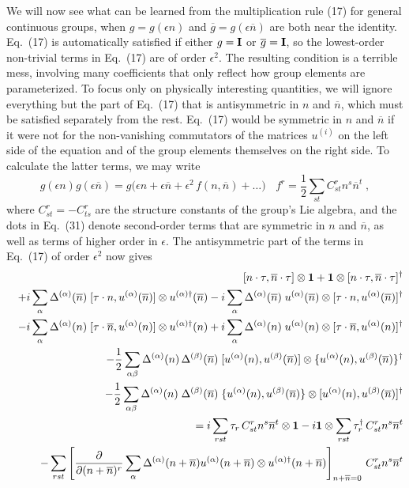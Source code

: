 We will now see what can be learned from the  multiplication rule (17) for general continuous groups, when $g=g(\epsilon n)$ and $\overline{g}=g(\epsilon\overline{n})$ are both near the identity.  Eq.~(17) is automatically satisfied if either $g={\bf I}$ or $\overline{g}={\bf I}$, so the lowest-order non-trivial terms in Eq.~(17) are of order $\epsilon^2$.  The resulting condition is a terrible mess, involving many coefficients that only reflect how group elements are parameterized.   To focus only on physically interesting quantities, we will ignore everything but the part of Eq.~(17) that is antisymmetric in $n$ and $\overline{n}$, which must be satisfied separately from the rest.   Eq.~(17) would be symmetric in $n$ and $\overline{n}$ if it were not for the non-vanishing commutators of the matrices $u^{(i)}$ on the left side of the equation and of the group elements themselves on the right side.  To calculate the latter terms, we may write                  
\begin{equation}
g(\epsilon n)g(\epsilon \overline{n})=g\Big(\epsilon n+\epsilon\overline{n}+\epsilon^2\,f(n,\overline{n})+\dots\Big)~~~~f^r=\frac{1}{2}\sum_{st}C^r_{st}n^s\overline{n}^t\;,
\end{equation}
where $C^r_{st}=-C^r_{ts}$ are the structure constants of the group's Lie algebra, and the dots in Eq.~(31) denote second-order terms that are symmetric in $n$ and $\overline{n}$, as well as terms of higher order in $\epsilon$.  The antisymmetric part of the terms in Eq.~(17) of order $\epsilon^2$ now gives
\begin{eqnarray}
&& [n\cdot\tau,\overline{n}\cdot\tau]\otimes {\mbox{\boldmath{$1$}}}+{\mbox{\boldmath{$1$}}}\otimes[n\cdot\tau,\overline{n}\cdot\tau]^\dagger\nonumber\\&&+i\sum_\alpha \Delta^{(\alpha)}(\overline{n})\;[\tau\cdot n,u^{(\alpha)}(\overline{n})]\otimes u^{(\alpha)\dagger}(\overline{n})-i\sum_\alpha \Delta^{(\alpha)}(\overline{n})\;
u^{(\alpha)}(\overline{n})\otimes [\tau\cdot n,u^{(\alpha)}(\overline{n})]^\dagger\nonumber\\&&
-i\sum_\alpha \Delta^{(\alpha)}(n)\;[\tau\cdot \overline{n},u^{(\alpha)}(n)]\otimes u^{(\alpha)\dagger}(n)+i\sum_\alpha \Delta^{(\alpha)}(n)\;
u^{(\alpha)}(n)\otimes [\tau\cdot \overline{n},u^{(\alpha)}(n)]^\dagger\nonumber\\&&
-\frac{1}{2}\sum_{\alpha\beta}\Delta^{(\alpha)}(n)\,\Delta^{(\beta)}(\overline{n})\;[u^{(\alpha)}(n),u^{(\beta)}(\overline{n})]\otimes \{u^{(\alpha)}(n),u^{(\beta)}(\overline{n})\}^\dagger\nonumber\\&&~~~
-\frac{1}{2}\sum_{\alpha\beta}\Delta^{(\alpha)}(n)\;\Delta^{(\beta)}(\overline{n})\;\{u^{(\alpha)}(n),u^{(\beta)}(\overline{n})\}\otimes [u^{(\alpha)}(n),u^{(\beta)}(\overline{n})]^\dagger\nonumber\\&&
=i\sum_{rst}\tau_r\,C^r_{st}n^s\overline{n}^t\otimes {\mbox{\boldmath{$1$}}}-i{\mbox{\boldmath{$1$}}}\otimes\sum_{rst}\tau^\dagger_r\,C^r_{st}n^s\overline{n}^t\nonumber\\&& -\sum_{rst} \left[\frac{\partial}{\partial (n+\overline{n})^r}\sum_\alpha\Delta^{(\alpha)}(n+\overline{n})u^{(\alpha)}(n+\overline{n})\otimes u^{(\alpha)\dagger}(n+\overline{n})\right]_{n+\overline{n}=0}\,C^r_{st}n^s\overline{n}^t
\end{eqnarray}
